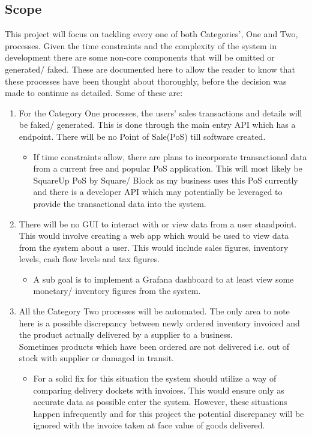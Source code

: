 \begin{flushleft}
	\subsection{Scope}
	This project will focus on tackling every one of both Categories', One and Two, processes. Given the time constraints and the complexity of the system in development
	there are some non-core components that	will be omitted or generated/ faked. These are documented here to allow the reader to know that these processes have been thought about thoroughly,
	before the decision was made to continue as detailed. Some of these are:
	\begin{enumerate}
		\item For the Category One processes, the users' sales transactions and details will be faked/ generated. This is done through the main entry API which has a 
		      endpoint. There will be no Point of Sale(PoS) till software created.
		      \begin{itemize}
			      \item If time constraints allow, there are plans to incorporate transactional data from a current free and popular PoS application. This will most likely be SquareUp
			            PoS \autocite{SquareSolutionsTools} by Square/ Block as my business uses this PoS currently and there is a developer API which may potentially be leveraged to provide the transactional
			            data into the system.
		      \end{itemize}
		\item There will be no GUI to interact with or view data from a user standpoint. This would involve creating a web app which would be used to view data from the system about a user. This
		      would include sales figures, inventory levels, cash flow levels and tax figures.
		      \begin{itemize}
			      \item A sub goal is to implement a Grafana dashboard to at least view some monetary/ inventory figures from the system.
		      \end{itemize}
		\item All the Category Two processes will be automated. The only area to note here is a possible discrepancy between newly ordered inventory invoiced and the product actually delivered
		      by a supplier to a business.\\
		      Sometimes products which have been ordered are not delivered i.e. out of stock with supplier or damaged in transit.
		      \begin{itemize}
			      \item For a solid fix for this situation the system should utilize a way of comparing delivery dockets with invoices. This would ensure only as accurate data as
			            possible enter the system. However, these situations happen infrequently and for this project the potential discrepancy will be ignored with the invoice taken at
			            face value of goods delivered.
		      \end{itemize}
	\end{enumerate}
	\pagebreak

\end{flushleft}
